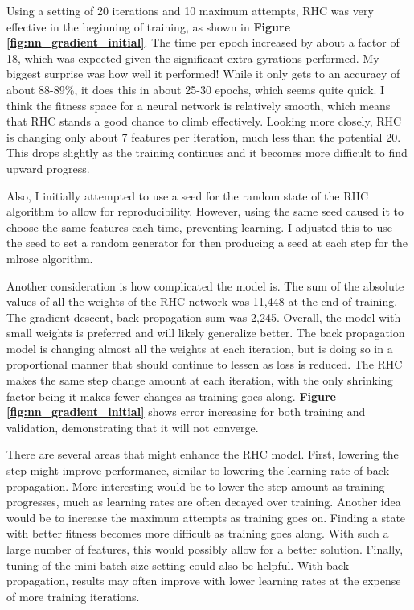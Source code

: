 \documentclass[letterpaper]{article} %
\begin{document}
Using a setting of 20 iterations and 10 maximum attempts, RHC was very effective in the beginning of training, as shown in \textbf{Figure \ref{fig:nn_gradient_initial}}.  The time per epoch increased by about a factor of 18, which was expected given the significant extra gyrations performed.  My biggest surprise was how well it performed!  While it only gets to an accuracy of about 88-89\%, it does this in about 25-30 epochs, which seems quite quick.  I think the fitness space for a neural network is relatively smooth, which means that RHC stands a good chance to climb effectively.  Looking more closely, RHC is changing only about 7 features per iteration, much less than the potential 20.  This drops slightly as the training continues and it becomes more difficult to find upward progress.  

Also, I initially attempted to use a seed for the random state of the RHC algorithm to allow for reproducibility.  However, using the same seed caused it to choose the same features each time, preventing learning.  I adjusted this to use the seed to set a random generator for then producing a seed at each step for the mlrose algorithm.

Another consideration is how complicated the model is.   The sum of the absolute values of all the weights of the RHC network was 11,448 at the end of training.  The gradient descent, back propagation sum was 2,245.  Overall, the model with small weights is preferred and will likely generalize better. The back propagation model is changing almost all the weights at each iteration, but is doing so in a proportional manner that should continue to lessen as loss is reduced.  The RHC makes the same step change amount at each iteration, with the only shrinking factor being it makes fewer changes as training goes along.   \textbf{Figure \ref{fig:nn_gradient_initial}} shows error increasing for both training and validation, demonstrating that it will not converge.

There are several areas that might enhance the RHC model. First, lowering the step might improve performance, similar to lowering the learning rate of back propagation.  More interesting would be to lower the step amount as training progresses,  much as learning rates are often decayed over training.  Another idea would be to increase the maximum attempts as training goes on.  Finding a state with better fitness becomes more difficult as training goes along. With such a large number of features,  this would possibly allow for a better solution.  Finally, tuning of the mini batch size setting could also be helpful.  With back propagation, results may often improve with lower learning rates at the expense of more training iterations. 
\end{document}
